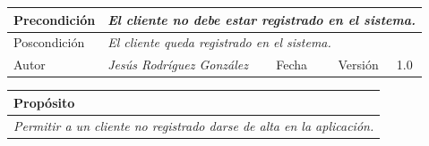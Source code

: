 \begin{table}[H]
\begin{tabular}{llllllll}
    \multicolumn{1}{|l|}{Precondición}                           & \multicolumn{7}{p{10cm}|}{{\color[HTML]{808080} \textit{El cliente no debe estar registrado en el sistema.}}}                                                                                                                                                                                                                                   \\ \hline
    \multicolumn{1}{|l|}{Poscondición}                           & \multicolumn{7}{l|}{{\color[HTML]{808080} \textit{El cliente queda registrado en el sistema.}}}                                                                                                                                                                                                                                                       \\ \hline
    \multicolumn{1}{|l|}{Autor}                                  & \multicolumn{1}{l|}{{\color[HTML]{808080} \textit{Jesús Rodríguez González}}}                           & \multicolumn{2}{l|}{Fecha}                                                   & \multicolumn{1}{l|}{}                          & \multicolumn{2}{l|}{Versión}                                                      & \multicolumn{1}{l|}{1.0}                                                     \\ \hline
    \end{tabular}
    \end{table}

    \begin{table}[H]
        \begin{tabular}{llllllll}
    \hline
    \multicolumn{8}{|l|}{\cellcolor[HTML]{F2F2F2}Propósito}                                                                                                                                                                                                                                                                                                                                                                                           \\ \hline
    \multicolumn{8}{|p{15cm}|}{{\color[HTML]{808080} \textit{Permitir a un cliente no registrado darse de alta en la aplicación.}}}                                                                                                                                                                                                             \\ \hline
    \end{tabular}
    \end{table}

